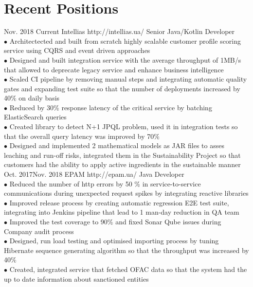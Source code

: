 \documentclass[10pt]{article} %
\begin{document}
\section{Recent Positions}
\job
{Nov. 2018 }{ Current}
{Intellias}
{http://intellias.ua/}
{Senior Java/Kotlin Developer}
{
\textbf{}   
\\$\bullet$ Architectected and built from scratch highly scalable customer profile scoring service using CQRS and event driven approaches
\\$\bullet$ Designed and built integration service with the average throughput of 1MB/s that allowed to deprecate legacy service and enhance business intelligence
\\$\bullet$ Scaled CI pipeline by removing manual steps and integrating automatic quality gates and expanding test suite so that the number of deployments increased by 40\% on daily basis 
\\$\bullet$ Reduced by 30\% response latency of the critical service by batching ElasticSearch queries 
\\$\bullet$ Created library to detect N+1 JPQL problem, used it in integration tests so that the overall query latency was improved by 70\% 
\\$\bullet$ Designed and implemented 2 mathematical models as JAR files to asses leaching and run-off risks, 
integrated them in the Sustainability Project so that customers had the ability to apply active ingredients in the sustainable manner
 }
\job
{Oct. 2017}{Nov. 2018}
{EPAM}
{http://epam.ua/}
{Java Developer}
{
\textbf{}    
\\$\bullet$ Reduced the number of http errors by 50 \% in service-to-service communications during unexpected request spikes by integrating reactive libraries 
\\$\bullet$ Improved release process by creating automatic regression E2E test suite, integrating into Jenkins pipeline that lead to 1 man-day reduction in QA team 
\\$\bullet$ Improved the test coverage to 90\% and fixed Sonar Qube issues during Company audit process
\\$\bullet$ Designed, run load testing and optimised importing process by tuning Hibernate sequence generating algorithm so that the throughput was increased by 40\%
\\$\bullet$ Created, integrated service that fetched OFAC data so that the system had the up to date information about sanctioned entities
 }
\end{document}
